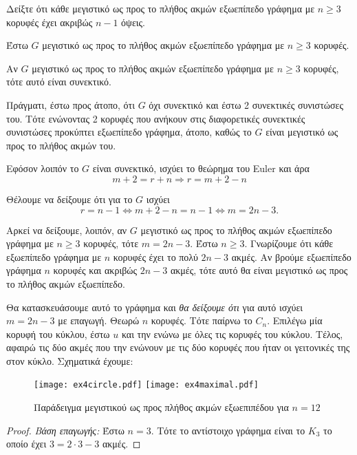 \begin{exercise}
Δείξτε ότι κάθε μεγιστικό ως προς το πλήθος ακμών εξωεπίπεδο γράφημα με $n \geq 3$ κορυφές έχει ακριβώς $n - 1$ όψεις.
\end{exercise}

\begin{solution}
Έστω $G$ μεγιστικό ως προς το πλήθος ακμών εξωεπίπεδο γράφημα με $n \geq 3$ κορυφές.

\begin{claim}
	Αν $G$ μεγιστικό ως προς το πλήθος ακμών εξωεπίπεδο γράφημα με $n \geq 3$ κορυφές, τότε αυτό είναι συνεκτικό.
\end{claim}

Πράγματι, έστω προς άτοπο, ότι $G$ όχι συνεκτικό και έστω 2 συνεκτικές συνιστώσες του. Τότε ενώνοντας 2 κορυφές που ανήκουν στις διαφορετικές συνεκτικές συνιστώσες προκύπτει εξωεπίπεδο γράφημα, άτοπο, καθώς το $G$ είναι μεγιστικό ως προς το πλήθος ακμών του.

Εφόσον λοιπόν το $G$ είναι συνεκτικό, ισχύει το θεώρημα του Euler και άρα 
\[
	m+2=r+n \Rightarrow r = m+2-n
\] 

Θέλουμε να δείξουμε ότι για το $G$ ισχύει
\begin{equation}
	r = n-1 \Longleftrightarrow m +2 - n = n-1 \Longleftrightarrow m = 2n-3.
	\label{eq:1}	
\end{equation}



Αρκεί να δείξουμε, λοιπόν, αν $G$ μεγιστικό ως προς το πλήθος ακμών εξωεπίπεδο γράφημα με $n \geq 3$ κορυφές, τότε $m = 2n-3$.
		Έστω $n \geq 3$. Γνωρίζουμε ότι κάθε εξωεπίπεδο γράφημα με $n$ κορυφές έχει το πολύ $2n-3$ ακμές. Αν βρούμε εξωεπίπεδο γράφημα $n$ κορυφές και ακριβώς  $2n-3$ ακμές, τότε αυτό θα είναι μεγιστικό ως προς το πλήθος ακμών εξωεπίπεδο. 
		
		Θα κατασκευάσουμε αυτό το γράφημα και \textit{θα δείξουμε ότι} για αυτό ισχύει $m=2n-3$ με επαγωγή. Θεωρώ $n$ κορυφές. Τότε παίρνω το $C_n$. Επιλέγω μία κορυφή του κύκλου, έστω $u$ και την ενώνω με όλες τις κορυφές του κύκλου. Τέλος, αφαιρώ τις δύο ακμές που την ενώνουν με τις δύο κορυφές που ήταν οι γειτονικές της στον κύκλο. Σχηματικά έχουμε: 
		
\begin{figure*}[h!]
	\texttt{[image: ex4circle.pdf]}
	\texttt{[image: ex4maximal.pdf]}
	\caption{Παράδειγμα μεγιστικού ως προς πλήθος ακμών εξωεπιπέδου για $n=12$}
\end{figure*}	
 \begin{proof}
 	\textit{Βάση επαγωγής:} Έστω $n=3$. Τότε το αντίστοιχο γράφημα είναι το $K_3$ το οποίο έχει $3=2\cdot 3 - 3$ ακμές.
 	

\end{proof}
\end{solution}
